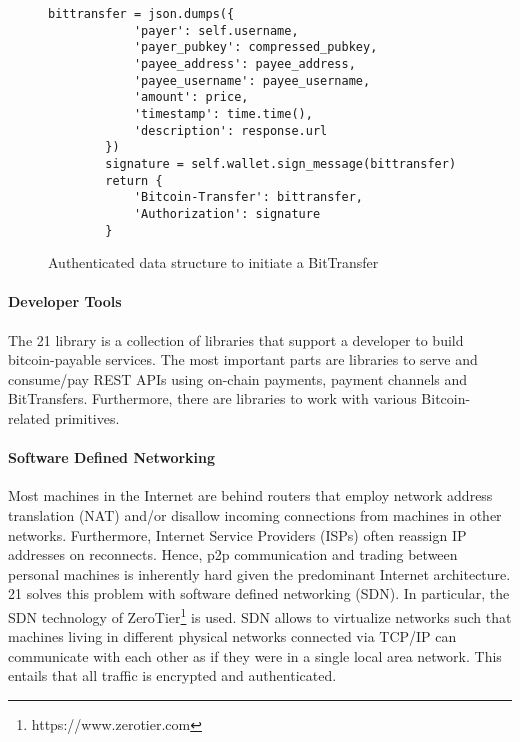 \begin{figure}
\label{lst:21bittransfer}
\begin{lstlisting}[breaklines]
        bittransfer = json.dumps({
            'payer': self.username,
            'payer_pubkey': compressed_pubkey,
            'payee_address': payee_address,
            'payee_username': payee_username,
            'amount': price,
            'timestamp': time.time(),
            'description': response.url
        })      
        signature = self.wallet.sign_message(bittransfer)
        return {
            'Bitcoin-Transfer': bittransfer,
            'Authorization': signature
        }
\end{lstlisting}
\caption{Authenticated data structure to initiate a BitTransfer%
}
\end{figure}


\paragraph{Developer Tools}

The 21 library is a collection of libraries that support a developer to build bitcoin-payable services. The most important parts are libraries to serve and consume/pay REST APIs using on-chain payments, payment channels and BitTransfers. Furthermore, there are libraries to work with various Bitcoin-related primitives.  


\paragraph{Software Defined Networking}

Most machines in the Internet are behind routers that employ network address translation (NAT) and/or disallow incoming connections from machines in other networks. Furthermore, Internet Service Providers (ISPs) often reassign IP addresses on reconnects. Hence, p2p communication and trading between personal machines is inherently hard given the predominant Internet architecture. 21 solves this problem with software defined networking (SDN). In particular, the SDN technology of ZeroTier\footnote{https://www.zerotier.com} is used. SDN allows to virtualize networks such that machines living in different physical networks connected via TCP/IP can communicate with each other as if they were in a single local area network. This entails that all traffic is encrypted and authenticated. 

